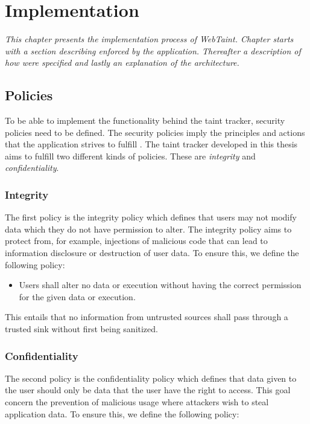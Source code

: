 \chapter{Implementation}
\label{Implementation}
\textit{This chapter presents the implementation process of WebTaint. Chapter starts with a section describing \textit{} enforced by the application. Thereafter a description of how  \textit{} were specified and lastly an explanation of the  \textit{} architecture.}



\section{Policies}
\label{Policies}
To be able to implement the functionality behind the taint tracker, security policies need to be defined. The security policies imply the principles and actions that the application strives to fulfill \parencite{BayukJenniferL2012Cspg}. The taint tracker developed in this thesis aims to fulfill two different kinds of policies. These are \textit{integrity} and \textit{confidentiality}.



\subsection{Integrity}
\label{Integrity}
The first policy is the integrity policy which defines that users may not modify data which they do not have permission to alter. The integrity policy aims to protect from, for example, injections of malicious code that can lead to information disclosure or destruction of user data. To ensure this, we define the following policy:

\hfill
\begin{itemize}
    \item Users shall alter no data or execution without having the correct permission for the given data or execution.
\end{itemize}
\hfill

This entails that no information from untrusted sources shall pass through a trusted sink without first being sanitized.



\subsection{Confidentiality}
\label{Confidentiality}
The second policy is the confidentiality policy which defines that data given to the user should only be data that the user have the right to access. This goal concern the prevention of malicious usage where attackers wish to steal application data. To ensure this, we define the following policy:

